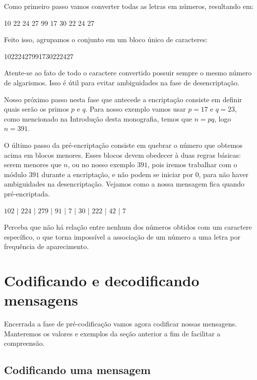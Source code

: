 Como primeiro passo vamos converter todas as letras em n\'umeros, resultando em:
 
\begin{center}
10 22 24 27 99 17 30 22 24 27
\end{center}

Feito isso, agrupamos o conjunto em um bloco \'unico de caracteres:

\begin{center}
10222427991730222427
\end{center}

Atente-se ao fato de todo o caractere convertido possuir sempre o mesmo n\'umero de algarismos. Isso \'e \'util para evitar ambiguidades na fase de desencripta\c{c}\~ao.

Nosso pr\'oximo passo nesta fase que antecede a encripta\c{c}\~ao consiste em definir quais ser\~ao os primos $p$ e $q$. Para nosso exemplo vamos usar $p=17$ e $q=23$, como mencionado na Introdu\c{c}\~ao desta monografia, temos que $n = pq$, logo $n=391$.

O \'ultimo passo da pr\'e-encripta\c{c}\~ao consiste em quebrar o n\'umero que obtemos acima em blocos menores. Esses blocos devem obedecer \`a duas regras b\'asicas: serem menores que $n$, ou no nosso exemplo $391$, pois iremos trabalhar com  o m\'odulo $391$ durante a encripta\c{c}\~ao, e n\~ao podem se iniciar por $0$, para n\~ao haver ambiguidades na desencripta\c{c}\~ao. Vejamos como a nossa mensagem fica quando pr\'e-encriptada.

\begin{center}
$102$ | $224$ | $279$ | $91$ | $7$ | $30$ | $222$ | $42$ | $7$
\end{center}

Perceba que n\~ao h\'a rela\c{c}\~ao entre nenhum dos n\'umeros obtidos com um caractere espec\'ifico, o que torna imposs\'ivel a associa\c{c}\~ao de um n\'umero a uma letra por frequ\^encia de aparecimento. 

\section{Codificando e decodificando mensagens}

Encerrada a fase de pr\'e-codifica\c{c}\~ao vamos agora codificar nossas mensagens. Manteremos os valores e exemplos da se\c{c}\~ao anterior a fim de facilitar a compreens\~ao.

\subsection{Codificando uma mensagem}

